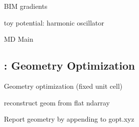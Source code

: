 \documentclass[letterpaper,10pt,english]{sphinxmanual}
\begin{document}

\begin{fulllineitems}
\label{\detokenize{drivers:drivers.bim_md.bim_force}}
BIM gradients

\end{fulllineitems}


\begin{fulllineitems}
\label{\detokenize{drivers:drivers.bim_md.hooke_force}}
toy potential: harmonic oscillator

\end{fulllineitems}


\begin{fulllineitems}
\label{\detokenize{drivers:drivers.bim_md.kernel}}
MD Main

\end{fulllineitems}



\subsection{: Geometry Optimization}
\label{\detokenize{drivers:bim-opt-geometry-optimization}}\label{\detokenize{drivers:module-drivers.bim_opt}}
Geometry optimization (fixed unit cell)

\begin{fulllineitems}
\label{\detokenize{drivers:drivers.bim_opt.from_flat}}
reconstruct geom from flat ndarray

\end{fulllineitems}


\begin{fulllineitems}
\label{\detokenize{drivers:drivers.bim_opt.gopt_callback}}
Report geometry by appending to gopt.xyz

\end{fulllineitems}
\end{document}

